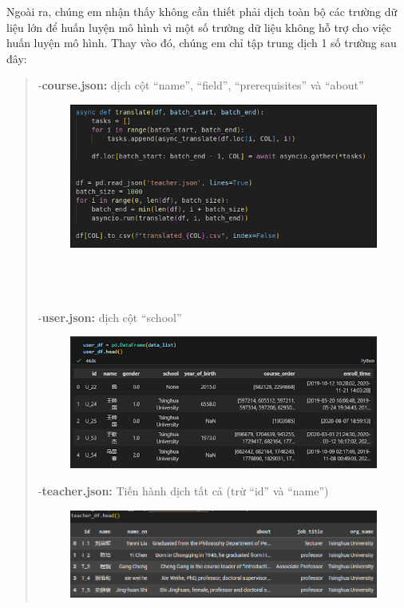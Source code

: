 \newpage
Ngoài ra, chúng em nhận thấy không cần thiết phải dịch toàn bộ các trường dữ liệu lớn để huấn luyện mô hình vì một số trường dữ liệu không hỗ trợ cho việc huấn luyện mô hình. Thay vào đó, chúng em chỉ tập trung dịch 1 số trường sau đây:
\begin{quote}
-\textbf{course.json:} dịch cột “name”, “field”, “prerequisites” và “about”\\
\begin{figure}[h]
    \centering
    \includegraphics[width=1\linewidth]{figures/2.png}
\end{figure}\\
\\
\\
-\textbf{user.json:} dịch cột “school”\\
\begin{figure}[h]
    \centering
    \includegraphics[width=0.8\linewidth]{figures/3.png}
\end{figure}
\newpage
-\textbf{teacher.json:} Tiến hành dịch tất cả (trừ “id” và “name”)\\
\begin{figure}[h]
    \centering
    \includegraphics[width=1\linewidth]{figures/4.png}

\end{figure}
\end{quote}
